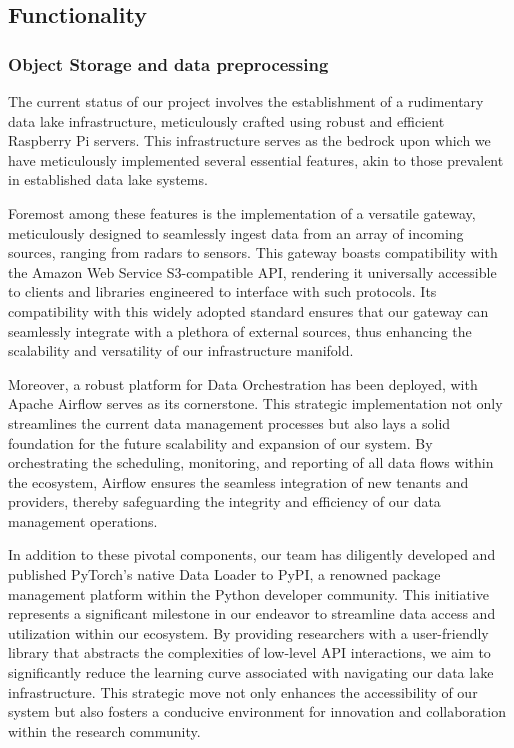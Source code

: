 \subsection{Functionality}

\subsubsection{Object Storage and data preprocessing}
The current status of our project involves the establishment of a rudimentary
data lake infrastructure, meticulously crafted using robust and efficient
Raspberry Pi servers. This infrastructure serves as the bedrock upon which we
have meticulously implemented several essential features, akin to those
prevalent in established data lake systems.

Foremost among these features is the implementation of a versatile gateway,
meticulously designed to seamlessly ingest data from an array of incoming
sources, ranging from radars to sensors. This gateway boasts compatibility with
the Amazon Web Service S3-compatible API, rendering it universally accessible to
clients and libraries engineered to interface with such protocols. Its
compatibility with this widely adopted standard ensures that our gateway can
seamlessly integrate with a plethora of external sources, thus enhancing the
scalability and versatility of our infrastructure manifold.

Moreover, a robust platform for Data Orchestration has been deployed, with
Apache Airflow serves as its cornerstone. This strategic implementation not
only streamlines the current data management processes but also lays a solid
foundation for the future scalability and expansion of our system. By
orchestrating the scheduling, monitoring, and reporting of all data flows within
the ecosystem, Airflow ensures the seamless integration of new tenants and
providers, thereby safeguarding the integrity and efficiency of our data
management operations.

In addition to these pivotal components, our team has diligently developed and
published PyTorch's native Data Loader to PyPI, a renowned package management
platform within the Python developer community. This initiative represents a
significant milestone in our endeavor to streamline data access and utilization
within our ecosystem. By providing researchers with a user-friendly library that
abstracts the complexities of low-level API interactions, we aim to
significantly reduce the learning curve associated with navigating our data lake
infrastructure. This strategic move not only enhances the accessibility of our
system but also fosters a conducive environment for innovation and collaboration
within the research community.

